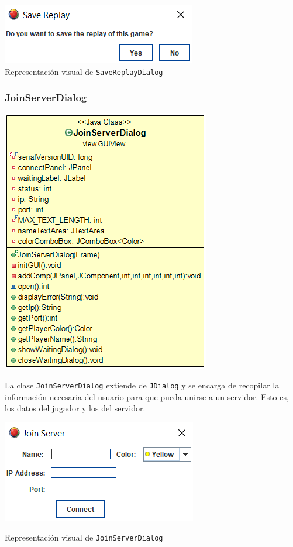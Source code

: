 \documentclass[../DocumentoOficial.tex]{subfiles}
\begin{document}
\begin{center}
\includegraphics[scale=1]{savereplaydialog-pic.png}\\
\footnotesize{Representación visual de \texttt{SaveReplayDialog}}
\end{center}

\subsubsection{JoinServerDialog}

\begin{center}
\includegraphics[scale=0.5]{join-server-uml.png}
\end{center}

La clase \texttt{JoinServerDialog} extiende de \texttt{JDialog} y se encarga de recopilar la información necesaria del usuario para que pueda unirse a un servidor. Esto es, los datos del jugador y los del servidor.

\begin{center}
\includegraphics[scale=1]{join-server-sprint-6.png}

Representación visual de \texttt{JoinServerDialog}

\end{center}
\end{document}

